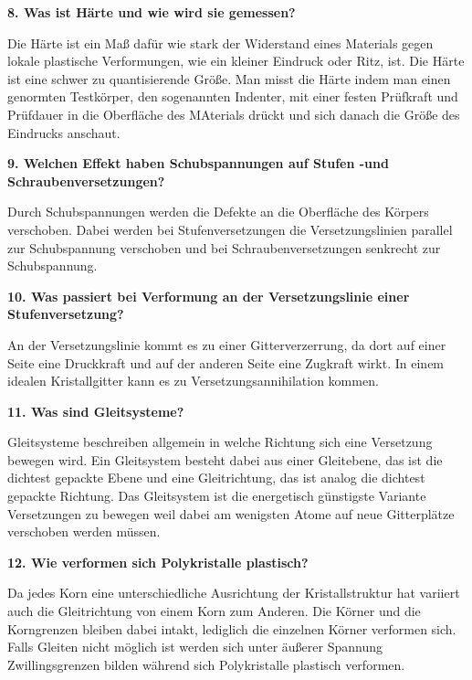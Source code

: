\noindent\textbf{8. Was ist Härte und wie wird sie gemessen?}\\
\begin{addmargin}[25pt]{0pt}
Die Härte ist ein Maß dafür wie stark der Widerstand eines Materials gegen lokale plastische Verformungen, wie ein kleiner Eindruck oder Ritz, ist. Die Härte ist eine schwer zu quantisierende Größe. Man misst die Härte indem man einen genormten Testkörper, den sogenannten Indenter, mit einer festen Prüfkraft und Prüfdauer in die Oberfläche des MAterials drückt und sich danach die Größe des Eindrucks anschaut.    \\
\end{addmargin}

\noindent\textbf{9. Welchen Effekt haben Schubspannungen auf Stufen -und Schraubenversetzungen?}\\
\begin{addmargin}[25pt]{0pt}
Durch Schubspannungen werden die Defekte an die Oberfläche des Körpers verschoben. Dabei werden bei Stufenversetzungen die Versetzungslinien parallel zur Schubspannung verschoben und bei Schraubenversetzungen senkrecht zur Schubspannung. \\
\end{addmargin}

\noindent\textbf{10. Was passiert bei Verformung an der Versetzungslinie einer Stufenversetzung?}\\
\begin{addmargin}[25pt]{0pt}
    An der Versetzungslinie kommt es zu einer Gitterverzerrung, da dort auf einer Seite eine Druckkraft und auf der anderen Seite eine Zugkraft wirkt. In einem idealen Kristallgitter kann es zu Versetzungsannihilation kommen. \\
\end{addmargin}

\noindent\textbf{11. Was sind Gleitsysteme?}\\
\begin{addmargin}[25pt]{0pt}
Gleitsysteme beschreiben allgemein in welche Richtung sich eine Versetzung bewegen wird. Ein Gleitsystem besteht dabei aus einer Gleitebene, das ist die dichtest gepackte Ebene und eine Gleitrichtung, das ist analog die dichtest gepackte Richtung. Das Gleitsystem ist die energetisch günstigste Variante Versetzungen zu bewegen weil dabei am wenigsten Atome auf neue Gitterplätze verschoben werden müssen.\\
\end{addmargin}

\noindent\textbf{12. Wie verformen sich Polykristalle plastisch?}\\
\begin{addmargin}[25pt]{0pt}
Da jedes Korn eine unterschiedliche Ausrichtung der Kristallstruktur hat variiert auch die Gleitrichtung von einem Korn zum Anderen. Die Körner und die Korngrenzen bleiben dabei intakt, lediglich die einzelnen Körner verformen sich. Falls Gleiten nicht möglich ist werden sich unter äußerer Spannung Zwillingsgrenzen bilden während sich Polykristalle plastisch verformen.\\
\end{addmargin}


